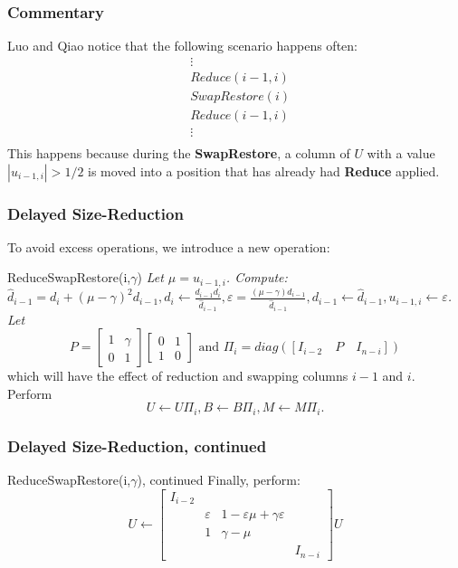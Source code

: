 \documentclass{beamer}
\begin{document}
\begin{frame}
\frametitle{Commentary}
Luo and Qiao notice that the following scenario happens often\cite{LuoQiaoParallelLLL}:
\begin{align*}
&\vdots \\
&Reduce(i-1,i) \\
&SwapRestore(i) \\
&Reduce(i-1,i) \\
&\vdots \\
\end{align*}
This happens because during the \textbf{SwapRestore}, a column of $U$ with a value $|u_{i-1,i}|>1/2$ is moved into a position that has already had \textbf{Reduce} applied.
\end{frame}

\begin{frame}
\frametitle{Delayed Size-Reduction}
To avoid excess operations, we introduce a new operation:
\begin{block}{ReduceSwapRestore(i,$\gamma$)} \textit{Let $\mu=u_{i-1,i}$. Compute: $\hat{d}_{i-1}=d_i+(\mu-\gamma)^2 d_{i-1}, d_i\leftarrow \frac{d_{i-1}d_i}{\hat{d}_{i-1}}, \varepsilon=\frac{(\mu-\gamma)d_{i-1}}{\hat{d}_{i-1}}, d_{i-1}\leftarrow \hat{d}_{i-1},u_{i-1,i}\leftarrow \varepsilon$. Let}
$$P=\left[\begin{array}{cc}
1 &\gamma \\
0 &1
\end{array}\right]\left[\begin{array}{cc}
0 &1 \\
1 &0
\end{array}\right]\text{ and } \Pi_i=diag([I_{i-2}\hspace{1em}P\hspace{1em}I_{n-i}])$$
which will have the effect of reduction and swapping columns $i-1$ and $i$.
Perform
$$U\leftarrow U\Pi_i, B\leftarrow B\Pi_i, M\leftarrow M\Pi_i.$$
\end{block}
\end{frame}
\begin{frame}
\frametitle{Delayed Size-Reduction, continued}
\begin{block}{ReduceSwapRestore(i,$\gamma$), continued}
Finally, perform:
$$U\leftarrow \left[\begin{array}{cccc}
I_{i-2} &&& \\
& \varepsilon &1-\varepsilon\mu+\gamma\varepsilon & \\
& 1 & \gamma-\mu & \\
&&& I_{n-i}
\end{array}\right]U$$
\end{block}
\end{frame}
\end{document}
